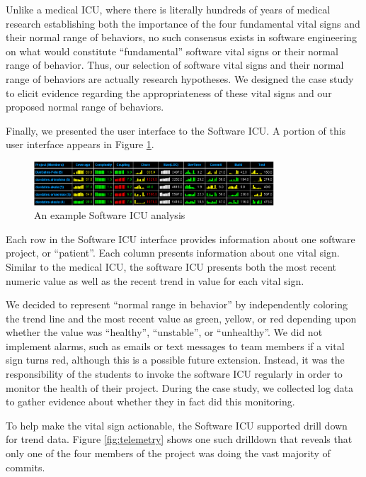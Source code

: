 \documentclass{acm_proc_article-sp}
\begin{document}
Unlike a medical ICU, where there is literally hundreds of years of medical
research establishing both the importance of the four fundamental vital
signs and their normal range of behaviors, no such consensus exists in
software engineering on what would constitute ``fundamental'' software
vital signs or their normal range of behavior.  Thus, our selection of
software vital signs and their normal range of behaviors are actually
research hypotheses.  We designed the case study to elicit evidence
regarding the appropriateness of these vital signs and our proposed normal
range of behaviors.

Finally, we presented the user interface to the Software ICU. A portion of
this user interface appears in Figure \ref{fig:sicu}.

\begin{figure}[ht]
  \center
  \includegraphics[width=0.8\textwidth]{portfolio-2008.eps}
  \caption{An example Software ICU analysis}
  \label{fig:sicu}
\end{figure} 

Each row in the Software ICU interface provides information about one
software project, or ``patient''.  Each column presents information about
one vital sign. Similar to the medical ICU, the software ICU presents both
the most recent numeric value as well as the recent trend in value for each
vital sign.

We decided to represent ``normal range in behavior'' by independently
coloring the trend line and the most recent value as green, yellow, or red
depending upon whether the value was ``healthy'', ``unstable'', or
``unhealthy''.  We did not implement alarms, such as emails or text
messages to team members if a vital sign turns red, although this is a
possible future extension.  Instead, it was the responsibility of the
students to invoke the software ICU regularly in order to monitor the
health of their project.  During the case study, we collected log data to
gather evidence about whether they in fact did this monitoring.

To help make the vital sign actionable, the Software ICU supported drill
down for trend data.  Figure \ref{fig:telemetry} shows one such drilldown
that reveals that only one of the four members of the project was doing the
vast majority of commits.
\end{document}
